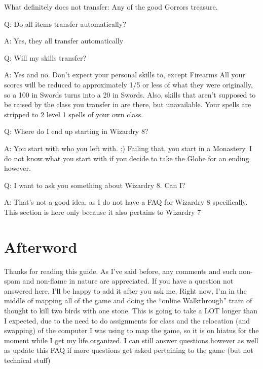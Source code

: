 \documentclass[12pt]{article}
\begin{document}
What definitely does not transfer:  Any of the good Gorrors treasure.

Q: Do all items transfer automatically?

A: Yes, they all transfer automatically

Q: Will my skills transfer?

A: Yes and no. Don't expect your personal skills to, except Firearms All
your scores will be reduced to approximately 1/5 or less of what they
were originally, so a 100 in Swords turns into a 20 in Swords. Also,
skills that aren't supposed to be raised by the class you transfer in
are there, but unavailable. Your spells are stripped to 2 level 1 spells
of your own class.

Q: Where do I end up starting in Wizardry 8?

A: You start with who you left with. :) Failing that, you start in a
Monastery. I do not know what you start with if you decide to take the
Globe for an ending however.

Q: I want to ask you something about Wizardry 8. Can I?

A: That's not a good idea, as I do not have a FAQ for Wizardry 8
specifically. This section is here only because it also pertains to
Wizardry 7


\section{Afterword}\label{afterword}

Thanks for reading this guide. As I've said before, any comments and such
non-spam and non-flame in nature are appreciated. If you have a question not
answered here, I'll be happy to add it after you ask me.  Right now, I'm in
the middle of mapping all of the game and doing the ``online Walkthrough''
train of thought to kill two birds with one stone. This is going to take a
LOT longer than I expected, due to the need to do assignments for class and
the relocation (and swapping) of the computer I was using to map the game, so
it is on hiatus for the moment while I get my life organized. I can still
answer questions however as well as update this FAQ if more questions get
asked pertaining to the game (but not technical stuff)
\end{document}

